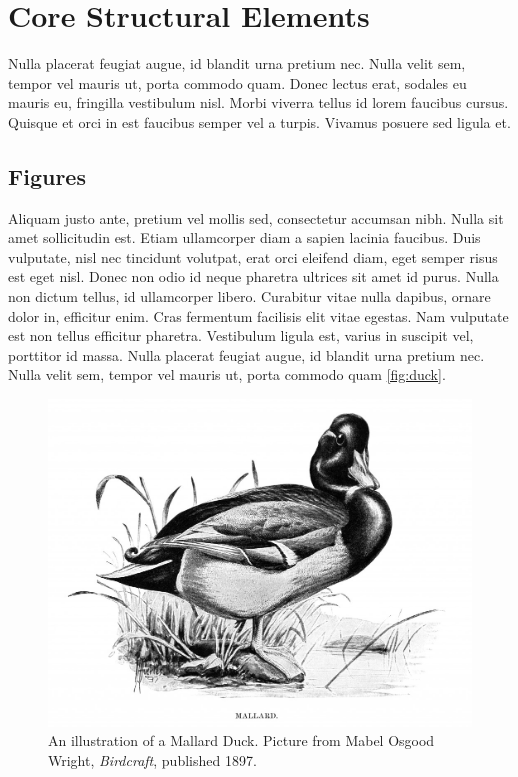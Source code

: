 \documentclass[sigconf, nonacm]{acmart}
\begin{document}
\section{Core Structural Elements}

Nulla placerat feugiat augue, id blandit urna pretium nec. Nulla velit sem, tempor vel mauris ut, porta commodo quam. Donec lectus erat, sodales eu mauris eu, fringilla vestibulum nisl. Morbi viverra tellus id lorem faucibus cursus. Quisque et orci in est faucibus semper vel a turpis. Vivamus posuere sed ligula et. 

\subsection{Figures}

Aliquam justo ante, pretium vel mollis sed, consectetur accumsan nibh. Nulla sit amet sollicitudin est. Etiam ullamcorper diam a sapien lacinia faucibus. Duis vulputate, nisl nec tincidunt volutpat, erat orci eleifend diam, eget semper risus est eget nisl. Donec non odio id neque pharetra ultrices sit amet id purus. Nulla non dictum tellus, id ullamcorper libero. Curabitur vitae nulla dapibus, ornare dolor in, efficitur enim. Cras fermentum facilisis elit vitae egestas. Nam vulputate est non tellus efficitur pharetra. Vestibulum ligula est, varius in suscipit vel, porttitor id massa. Nulla placerat feugiat augue, id blandit urna pretium nec. Nulla velit sem, tempor vel mauris ut, porta commodo quam \autoref{fig:duck}.

\begin{figure}
  \centering
  \includegraphics[width=\linewidth]{figures/duck}
  \caption{An illustration of a Mallard Duck. Picture from Mabel Osgood Wright, \textit{Birdcraft}, published 1897.}
  \label{fig:duck}
\end{figure}
\end{document}
